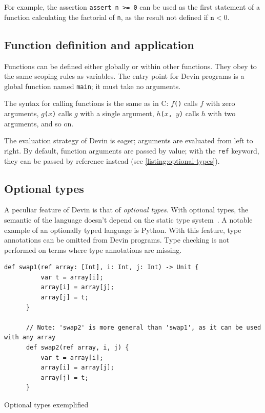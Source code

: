 \documentclass[UdineBachThesis,american,11pt]{PhdThesis}
\begin{document}
  For example, the assertion \mbox{\texttt{assert n >= 0}} can be used as the
  first statement of a function calculating the factorial of \texttt{n}, as the
  result not defined if \mbox{$\mathtt{n} < 0$}.

  \subsection{Function definition and application}

  Functions can be defined either globally or within other functions. They obey
  to the same scoping rules as variables. The entry point for Devin programs is
  a global function named \mbox{\texttt{main}}; it must take no arguments.

  The syntax for calling functions is the same as in C: \mbox{\texttt{$f$()}}
  calls $f$ with zero arguments, \mbox{\texttt{$g$($x$)}} calls $g$ with a
  single argument, \mbox{\texttt{$h$($x$, $y$)}} calls $h$ with two arguments,
  and so on.

  The evaluation strategy of Devin is eager; arguments are evaluated from left
  to right. By default, function arguments are passed by value; with the
  \mbox{\texttt{ref}} keyword, they can be passed by reference instead (see
  \autoref{listing:optional-types}).

  \subsection{Optional types}

  A peculiar feature of Devin is that of \emph{optional types}. With optional
  types, the semantic of the language doesn't depend on the static type
  system~\cite{pluggable-type-systems}. A notable example of an optionally typed
  language is Python. With this feature, type annotations can be omitted from
  Devin programs. Type checking is not performed on terms where type annotations
  are missing.

  \begin{Listing}[H]
    \begin{Verbatim}[gobble=6,fontsize=\small]
      def swap1(ref array: [Int], i: Int, j: Int) -> Unit {
          var t = array[i];
          array[i] = array[j];
          array[j] = t;
      }

      // Note: 'swap2' is more general than 'swap1', as it can be used with any array
      def swap2(ref array, i, j) {
          var t = array[i];
          array[i] = array[j];
          array[j] = t;
      }
    \end{Verbatim}
    \vspace{\prevdepth-\depthof{\strut}}

    \caption{Optional types exemplified}
    \label{listing:optional-types}
  \end{Listing}
\end{document}
